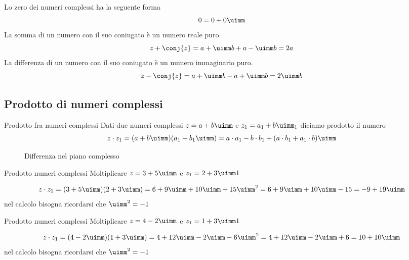 Lo zero dei numeri complessi ha la seguente forma
\[0=0+0\uimm\]
La somma di un numero con il suo coniugato è un numero reale puro. \[z+\conj{z}=a+\uimm b+a-\uimm b=2a \] 
La differenza di un numero con il suo coniugato è un numero immaginario puro. \[z-\conj{z}=a+\uimm b-a+\uimm b=2\uimm b \] 

\subsection{Prodotto di numeri complessi}
\begin{definizionet}{Prodotto fra numeri complessi}{}
	Dati due numeri complessi  $z=a+b\uimm $ e  $z_1=a_1+b\uimm _1$ diciamo prodotto il numero \[z\cdot z_1=(a+b\uimm)(a_1+b_1\uimm)=a\cdot a_1-b\cdot b_1+(a\cdot b_1+a_1\cdot b)\uimm\]
\end{definizionet}
\begin{figure}
	\centering
	
	\caption{Differenza nel piano complesso}
	\label{fig:DifferenzaPianoComplesso}
\end{figure}
\begin{esempiot}{Prodotto numeri complessi}{}
	Moltiplicare $z=3+5\uimm $ e  $z_1=2+3\uimm1$ 
\end{esempiot}	
	 \[z\cdot z_1=(3+5\uimm)(2+3\uimm)= 6+9\uimm +10\uimm +15\uimm^2=6+9\uimm +10\uimm -15 =-9+19\uimm \]
	nel calcolo bisogna ricordarsi che $\uimm^2=-1$
\begin{esempiot}{Prodotto numeri complessi}{}
	Moltiplicare $z=4-2\uimm $ e  $z_1=1+3\uimm1$  
\end{esempiot}	
	\[z\cdot z_1=(4-2\uimm)(1+3\uimm)= 4+12\uimm -2\uimm -6\uimm^2= 4+12\uimm -2\uimm +6=10+10\uimm \]
	nel calcolo bisogna ricordarsi che $\uimm^2=-1$

